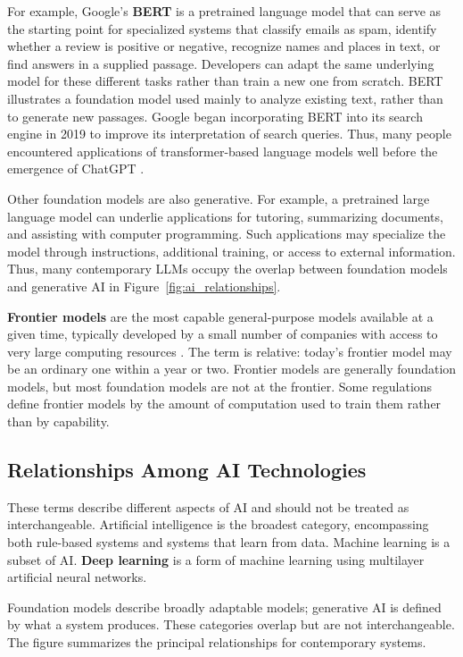 \documentclass[11pt]{article}
\begin{document}
For example, Google's \textbf{BERT} \citep{Devlin2019BERT} is a pretrained language model that can
serve as the starting point for specialized systems that classify
emails as spam, identify whether a review is positive or negative,
recognize names and places in text, or find answers in a supplied
passage. Developers can adapt the same underlying model for these
different tasks rather than train a new one from scratch. BERT
illustrates a foundation model used mainly to analyze existing
text, rather than to generate new passages.
Google began incorporating BERT into its search engine in 2019 to improve its interpretation of search queries. Thus, many people encountered applications of transformer-based language models well before the emergence of ChatGPT \citep{Google2019BERTSearch}.


Other foundation models are also generative. For example, a
pretrained large language model can underlie applications for
tutoring, summarizing documents, and assisting with computer
programming. Such applications may specialize the model through
instructions, additional training, or access to external information.
Thus, many contemporary LLMs occupy the overlap between foundation
models and generative AI in Figure~\ref{fig:ai_relationships}.

\textbf{Frontier models} are the most capable general-purpose
models available at a given time, typically developed by a small
number of companies with access to very large computing resources
\citep{StanfordHAIFrontier}. The term is relative: today's frontier
model may be an ordinary one within a year or two. Frontier models
are generally foundation models, but most foundation models are not
at the frontier. Some regulations define frontier models by the
amount of computation used to train them rather than by capability.

\subsection{Relationships Among AI Technologies}

These terms describe different aspects of AI and should not be
treated as interchangeable. Artificial intelligence is the
broadest category, encompassing both rule-based systems and
systems that learn from data. Machine learning is a subset of
AI. \textbf{Deep learning} is a form of machine learning
using multilayer artificial neural networks.

Foundation models describe broadly adaptable models; generative AI
is defined by what a system produces. These categories overlap but
are not interchangeable. The figure summarizes the principal
relationships for contemporary systems.
\end{document}
